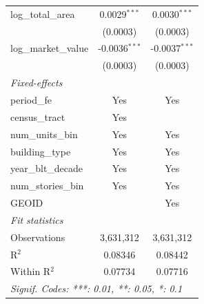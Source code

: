 \begin{tabular}{lcc}
   log\_total\_area                                      & 0.0029$^{***}$          & 0.0030$^{***}$\\   
                                                         & (0.0003)                & (0.0003)\\   
   log\_market\_value                                    & -0.0036$^{***}$         & -0.0037$^{***}$\\   
                                                         & (0.0003)                & (0.0003)\\   
   \midrule
   \emph{Fixed-effects}\\
   period\_fe                                            & Yes                     & Yes\\  
   census\_tract                                         & Yes                     & \\  
   num\_units\_bin                                       & Yes                     & Yes\\  
   building\_type                                        & Yes                     & Yes\\  
   year\_blt\_decade                                     & Yes                     & Yes\\  
   num\_stories\_bin                                     & Yes                     & Yes\\  
   GEOID                                                 &                         & Yes\\  
   \midrule
   \emph{Fit statistics}\\
   Observations                                          & 3,631,312               & 3,631,312\\  
   R$^2$                                                 & 0.08346                 & 0.08442\\  
   Within R$^2$                                          & 0.07734                 & 0.07716\\  
   \midrule \midrule
   \multicolumn{3}{l}{\emph{Signif. Codes: ***: 0.01, **: 0.05, *: 0.1}}\\
\end{tabular}
\par\endgroup
\begingroup
\centering
